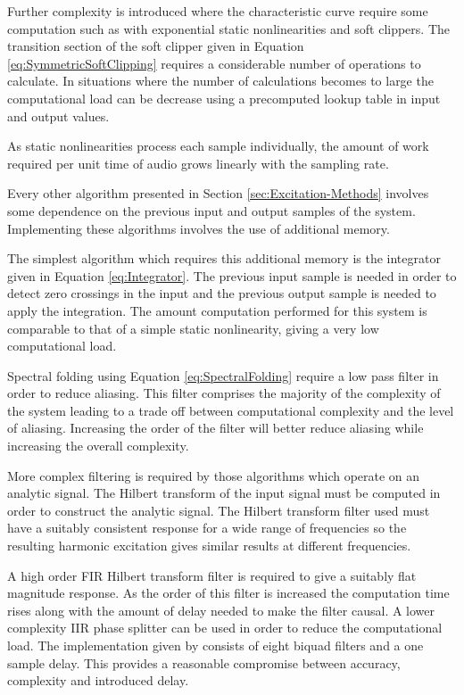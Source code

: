 		Further complexity is introduced where the characteristic curve require some computation such as with
		exponential static nonlinearities and soft clippers. The transition section of the soft clipper given in
		Equation \ref{eq:SymmetricSoftClipping} requires a considerable number of operations to calculate. In
		situations where the number of calculations becomes to large the computational load can be decrease using a
		precomputed lookup table in input and output values.

		As static nonlinearities process each sample individually, the amount of work required per unit time of
		audio grows linearly with the sampling rate.

		Every other algorithm presented in Section \ref{sec:Excitation-Methods} involves some dependence on the
		previous input and output samples of the system. Implementing these algorithms involves the use of
		additional memory.

		The simplest algorithm which requires this additional memory is the integrator given in Equation
		\ref{eq:Integrator}. The previous input sample is needed in order to detect zero crossings in the input and
		the previous output sample is needed to apply the integration. The amount computation performed for this
		system is comparable to that of a simple static nonlinearity, giving a very low computational load.

		Spectral folding using Equation \ref{eq:SpectralFolding} require a low pass filter in order to reduce
		aliasing. This filter comprises the majority of the complexity of the system leading to a trade off between
		computational complexity and the level of aliasing. Increasing the order of the filter will better reduce
		aliasing while increasing the overall complexity.

		More complex filtering is required by those algorithms which operate on an analytic signal. The Hilbert
		transform of the input signal must be computed in order to construct the analytic signal. The Hilbert
		transform filter used must have a suitably consistent response for a wide range of frequencies so the
		resulting harmonic excitation gives similar results at different frequencies.

		A high order FIR Hilbert transform filter is required to give a suitably flat magnitude response. As the
		order of this filter is increased the computation time rises along with the amount of delay needed to make
		the filter causal. A lower complexity IIR phase splitter can be used in order to reduce the computational
		load. The implementation given by \citet{niemitalo2003hilbert} consists of eight biquad filters and a one
		sample delay. This provides a reasonable compromise between accuracy, complexity and introduced delay.

